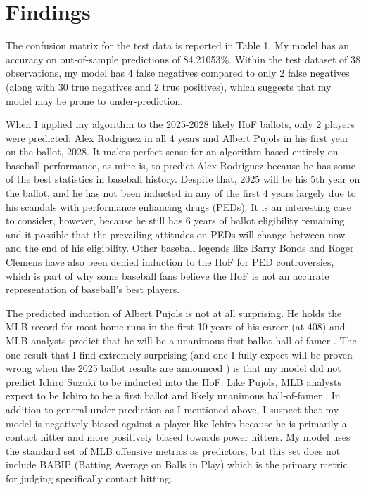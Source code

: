 \documentclass[12pt,english]{article}
\begin{document}
\section{Findings}\label{sec:results}
The confusion matrix for the test data is reported in Table 1. My model has an accuracy on out-of-sample predictions of 84.21053\%. Within the test dataset of 38 observations, my model has 4 false negatives compared to only 2 false negatives (along with 30 true negatives and 2 true positives), which suggests that my model may be prone to under-prediction. 

When I applied my algorithm to the 2025-2028 likely HoF ballots, only 2 players were predicted: Alex Rodriguez in all 4 years and Albert Pujols in his first year on the ballot, 2028. It makes perfect sense for an algorithm based entirely on baseball performance, as mine is, to predict Alex Rodriguez because he has some of the best statistics in baseball history. Despite that, 2025 will be his 5th year on the ballot, and he has not been inducted in any of the first 4 years largely due to his scandals with performance enhancing drugs (PEDs). It is an interesting case to consider, however, because he still has 6 years of ballot eligibility remaining and it possible that the prevailing attitudes on PEDs will change between now and the end of his eligibility. Other baseball legends like Barry Bonds and Roger Clemens have also been denied induction to the HoF for PED controversies, which is part of why some baseball fans believe the HoF is not an accurate representation of baseball's best players.

The predicted induction of Albert Pujols is not at all surprising. He holds the MLB record for most home runs in the first 10 years of his career (at 408) and MLB analysts predict that he will be a unanimous first ballot hall-of-famer \cite{mlb2024}. The one result that I find extremely surprising (and one I fully expect will be proven wrong when the 2025 ballot results are announced ) is that my model did not predict Ichiro Suzuki to be inducted into the HoF. Like Pujols, MLB analysts expect to be Ichiro to be a first ballot and likely unanimous hall-of-famer \cite{mlb2024}. In addition to general under-prediction as I mentioned above, I suspect that my model is negatively biased against a player like Ichiro because he is primarily a contact hitter and more positively biased towards power hitters. My model uses the standard set of MLB offensive metrics as predictors, but this set does not include BABIP (Batting Average on Balls in Play) which is the primary metric for judging specifically contact hitting. 
\end{document}
